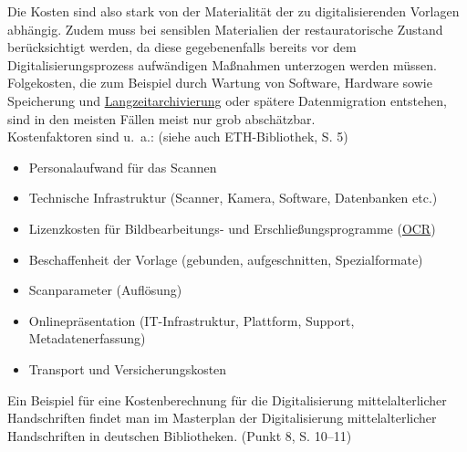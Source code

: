 \documentclass{article}
\begin{document}
        Die Kosten sind also stark von der Materialität der zu digitalisierenden Vorlagen
                  abhängig. Zudem muss bei sensiblen Materialien der restauratorische Zustand
                  berücksichtigt werden, da diese gegebenenfalls bereits vor dem
                  Digitalisierungsprozess aufwändigen Maßnahmen unterzogen werden müssen.
                  Folgekosten, die zum Beispiel durch Wartung von Software, Hardware sowie
                  Speicherung und \href{http://gams.uni-graz.at/o:konde.6}{Langzeitarchivierung} oder spätere Datenmigration entstehen, sind in den
                  meisten Fällen meist nur grob abschätzbar. \\
            
        Kostenfaktoren sind u. a.:
                  (siehe auch ETH-Bibliothek, S. 5)\\
            
        \begin{itemize}\item {
                     Personalaufwand für das Scannen 
                  }\item {
                     Technische Infrastruktur (Scanner, Kamera, Software,
                        Datenbanken etc.) 
                  }\item {
                     Lizenzkosten für Bildbearbeitungs- und Erschließungsprogramme
                        (\href{http://gams.uni-graz.at/o:konde.149)}{OCR})
                     
                  }\item {
                     Beschaffenheit der Vorlage (gebunden, aufgeschnitten, Spezialformate)
                  }\item {Scanparameter (Auflösung) 
                  }\item {Onlinepräsentation (IT-Infrastruktur, Plattform, Support,
                        Metadatenerfassung) 
                  }\item {Transport und Versicherungskosten 
                  }\end{itemize}Ein Beispiel für eine Kostenberechnung für die Digitalisierung mittelalterlicher
                  Handschriften findet man im Masterplan der Digitalisierung
                     mittelalterlicher Handschriften in deutschen Bibliotheken. (Punkt 8,
                     S. 10–11)\\
            
\end{document}
